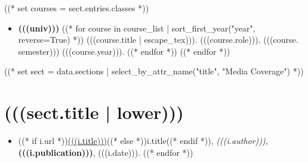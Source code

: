 \documentclass[10pt,oneside]{article}
\begin{document}
\mbox{}\vspace{-\dimexpr\baselineskip\relax}

((* set courses = sect.entries.classes *))
\begin{itemize}[label={}]
  ((* for univ, course_list in courses | groupby("university")  *))
  \item \textbf{(((univ)))}
        ((* for course in course_list | sort_first_year("year", reverse=True) *))
        (((course.title | escape_tex))). (((course.role))). (((course. semester))) (((course.year))).
        ((* endfor *))
        ((* endfor *))
\end{itemize}

%
%

((* set sect = data.sections | select_by_attr_name("title", "Media Coverage") *))
\section{\color{BrickRed}(((sect.title | lower)))}

\mbox{}\vspace{-\dimexpr\baselineskip\relax}

\begin{itemize}[label={}]
  ((* for i in sect.entries.media | sort(attribute="date", reverse=True) *))
  \item ((* if i.url *))\href{(((i.url)))}{(((i.title)))}((* else *))i.title((* endif *)), \textit{(((i.author)))}, \textbf{(((i.publication)))}, (((i.date))).
        ((* endfor *))
\end{itemize}
\end{document}
